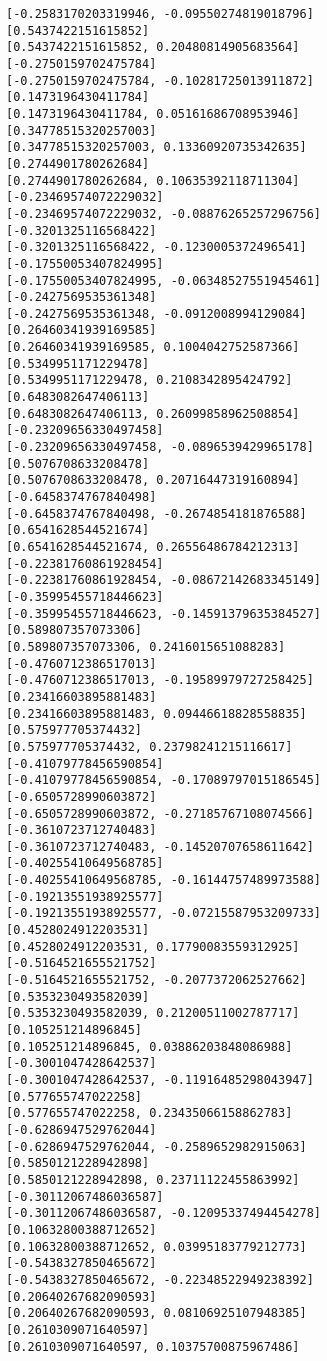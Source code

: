\documentclass[11pt]{article}
\begin{document}
\begin{Verbatim}[commandchars=\\\{\}]
[-0.2583170203319946, -0.09550274819018796]
[0.5437422151615852]
[0.5437422151615852, 0.20480814905683564]
[-0.2750159702475784]
[-0.2750159702475784, -0.10281725013911872]
[0.1473196430411784]
[0.1473196430411784, 0.05161686708953946]
[0.34778515320257003]
[0.34778515320257003, 0.13360920735342635]
[0.2744901780262684]
[0.2744901780262684, 0.10635392118711304]
[-0.23469574072229032]
[-0.23469574072229032, -0.08876265257296756]
[-0.3201325116568422]
[-0.3201325116568422, -0.1230005372496541]
[-0.17550053407824995]
[-0.17550053407824995, -0.06348527551945461]
[-0.2427569535361348]
[-0.2427569535361348, -0.0912008994129084]
[0.26460341939169585]
[0.26460341939169585, 0.1004042752587366]
[0.5349951171229478]
[0.5349951171229478, 0.2108342895424792]
[0.6483082647406113]
[0.6483082647406113, 0.26099858962508854]
[-0.23209656330497458]
[-0.23209656330497458, -0.0896539429965178]
[0.5076708633208478]
[0.5076708633208478, 0.20716447319160894]
[-0.6458374767840498]
[-0.6458374767840498, -0.2674854181876588]
[0.6541628544521674]
[0.6541628544521674, 0.26556486784212313]
[-0.22381760861928454]
[-0.22381760861928454, -0.08672142683345149]
[-0.35995455718446623]
[-0.35995455718446623, -0.14591379635384527]
[0.589807357073306]
[0.589807357073306, 0.2416015651088283]
[-0.4760712386517013]
[-0.4760712386517013, -0.19589979727258425]
[0.23416603895881483]
[0.23416603895881483, 0.09446618828558835]
[0.575977705374432]
[0.575977705374432, 0.23798241215116617]
[-0.41079778456590854]
[-0.41079778456590854, -0.17089797015186545]
[-0.6505728990603872]
[-0.6505728990603872, -0.27185767108074566]
[-0.3610723712740483]
[-0.3610723712740483, -0.14520707658611642]
[-0.40255410649568785]
[-0.40255410649568785, -0.16144757489973588]
[-0.19213551938925577]
[-0.19213551938925577, -0.07215587953209733]
[0.4528024912203531]
[0.4528024912203531, 0.17790083559312925]
[-0.5164521655521752]
[-0.5164521655521752, -0.2077372062527662]
[0.5353230493582039]
[0.5353230493582039, 0.21200511002787717]
[0.105251214896845]
[0.105251214896845, 0.03886203848086988]
[-0.3001047428642537]
[-0.3001047428642537, -0.11916485298043947]
[0.577655747022258]
[0.577655747022258, 0.23435066158862783]
[-0.6286947529762044]
[-0.6286947529762044, -0.2589652982915063]
[0.5850121228942898]
[0.5850121228942898, 0.23711122455863992]
[-0.30112067486036587]
[-0.30112067486036587, -0.12095337494454278]
[0.10632800388712652]
[0.10632800388712652, 0.03995183779212773]
[-0.5438327850465672]
[-0.5438327850465672, -0.22348522949238392]
[0.20640267682090593]
[0.20640267682090593, 0.08106925107948385]
[0.2610309071640597]
[0.2610309071640597, 0.10375700875967486]

\end{Verbatim}
\end{document}
